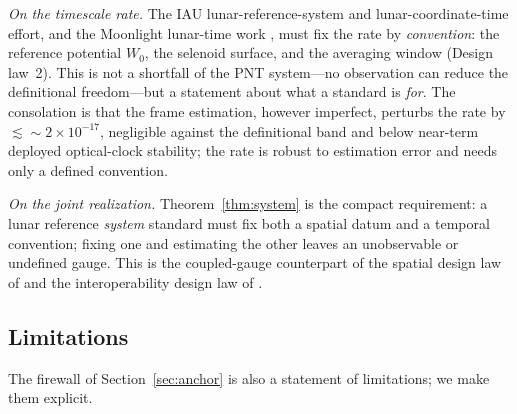 \emph{On the timescale rate.} The IAU lunar-reference-system and lunar-coordinate-time
effort, and the Moonlight lunar-time work \citep{fienga2024moonlight}, must fix the rate by
\emph{convention}: the reference potential $W_0$, the selenoid surface, and the averaging
window (Design law~2). This is not a shortfall of the PNT system---no observation can reduce
the definitional freedom---but a statement about what a standard is \emph{for}. The
consolation is that the frame estimation, however imperfect, perturbs the rate by
$\lesssim\!\sim\!2\times10^{-17}$, negligible against the definitional band and below
near-term deployed optical-clock stability; the rate is robust to estimation error and needs
only a defined convention.

\emph{On the joint realization.} Theorem~\ref{thm:system} is the compact requirement: a
lunar reference \emph{system} standard must fix both a spatial datum and a temporal
convention; fixing one and estimating the other leaves an unobservable or undefined gauge.
This is the coupled-gauge counterpart of the spatial design law of \citep{baweja2026datum}
and the interoperability design law of \citep{baweja2026interop}.

\subsection{Limitations}
\label{sec:limitations}

The firewall of Section~\ref{sec:anchor} is also a statement of limitations; we make them
explicit.

